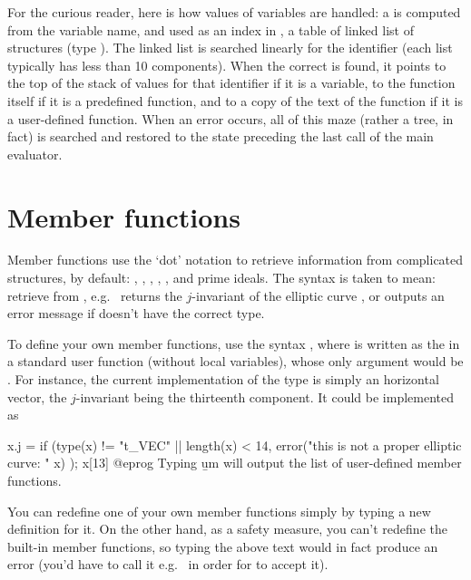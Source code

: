  For the curious reader, here is how values
of variables are handled: a  is computed from the
variable name, and used as an index in , a table of linked
list of structures (type ). The linked list is searched linearly
for the identifier (each list typically has less than 10 components). When
the correct  is found, it points to the top of the stack of
values for that identifier if it is a variable, to the function itself if it
is a predefined function, and to a copy of the text of the function if it is
a user-defined function. When an error occurs, all of this maze (rather a
tree, in fact) is searched and restored to the state preceding the last call
of the main evaluator.

\section{Member functions} \label{se:member}

Member functions use the `dot' notation to retrieve information from
complicated structures, by default: , , ,
, ,  and prime ideals. The syntax
 is taken to mean: retrieve  from
, e.g.~ returns the $j$-invariant of the elliptic
curve , or outputs an error message if  doesn't have the
correct type.

To define your own member functions, use the syntax , where  is written as the  in a
standard user function (without local variables), whose only argument would
be . For instance, the current implementation of the 
type is simply an horizontal vector, the $j$-invariant being the thirteenth
component. It could be implemented as

\bprog
x.j =
{
  if (type(x) != "t_VEC" || length(x) < 14,
    error("this is not a proper elliptic curve: " x)
  );
  x[13]
}
@eprog\noindent
Typing \b{um} will output the list of user-defined member functions.

You can redefine one of your own member functions simply by typing a new
definition for it. On the other hand, as a safety measure, you can't redefine
the built-in member functions, so typing the above text would in fact produce
an error (you'd have to call it e.g.~ in order for  to
accept it).

